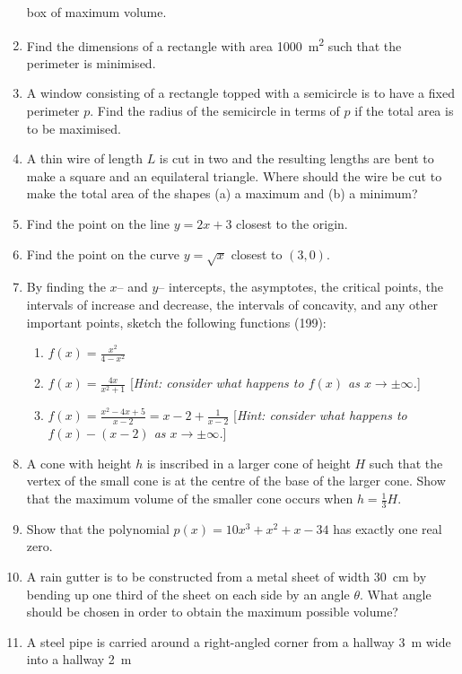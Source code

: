 \begin{enumerate}
        box of maximum volume.
  \item Find the dimensions of a rectangle with area \SI{1000}{\metre\squared} such that the perimeter is minimised.
  \item A window consisting of a rectangle topped with a semicircle is to have a fixed perimeter $ p $. Find the radius
        of the semicircle in terms of $ p $ if the total area is to be maximised.
  \item A thin wire of length $ L $ is cut in two and the resulting lengths are bent to make a square and an equilateral triangle. Where
        should the wire be cut to make the total area of the shapes (a) a maximum and (b) a minimum?
  \item Find the point on the line $ y = 2x + 3 $ closest to the origin.
  \item Find the point on the curve $ y = \sqrt{x} $ closest to $ (3, 0) $.
  \item By finding the $ x$-- and $ y$-- intercepts, the asymptotes, the critical points, the
        intervals of increase and decrease, the intervals of concavity, and any other important
        points, sketch the following functions (199):
    \begin{enumerate}
      \item $ f(x) = \frac{x^2}{4 - x^2} $
      \item $ f(x) = \frac{4x}{x^2 + 1} $ [\textit{Hint: consider what happens to $ f(x) $ as $ x \to \pm\infty $.}]
      \item $ f(x) = \frac{x^2 - 4x + 5}{x - 2} = x - 2 + \frac{1}{x - 2} $ [\textit{Hint: consider what happens to $ f(x) - (x - 2) $ as $ x \to \pm\infty $.}]
    \end{enumerate}
  \item A cone with height $ h $ is inscribed in a larger cone of height $ H $ such that the vertex of the small cone
        is at the centre of the base of the larger cone. Show that the maximum volume of the smaller cone occurs when $ h = \frac{1}{3} H $.
  \item Show that the polynomial $ p(x) = 10x^3 + x^2 + x - 34 $ has exactly one real zero.
  \item A rain gutter is to be constructed from a metal sheet of width \SI{30}{\centi\metre} by bending up
        one third of the sheet on each side by an angle $ \theta $. What angle should be chosen in order to
        obtain the maximum possible volume?
  \item A steel pipe is carried around a right-angled corner from a hallway \SI{3}{\metre} wide into a hallway \SI{2}{\metre}

\end{enumerate}
